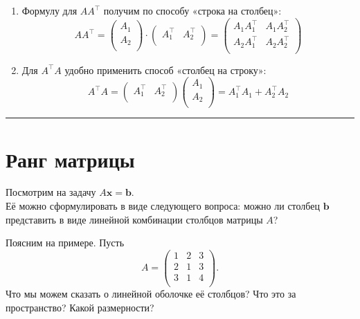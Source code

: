 \documentclass[11pt,a4paper]{article}
\renewcommand{\linethickness}{0.1ex}
\providecommand{\tightlist}{%
      \setlength{\itemsep}{0pt}\setlength{\parskip}{0pt}}
\begin{document}
\begin{enumerate}
\def\labelenumi{\arabic{enumi}.}
\tightlist
\item
  Формулу для \(A A^\top\) получим по способу «строка на столбец»: \[
    A A^\top = 
    \begin{pmatrix}
   A_1 \\
   A_2 \\
    \end{pmatrix}
    \cdot
    \begin{pmatrix}
   A_1^\top & A_2^\top \\
    \end{pmatrix}
    =
    \begin{pmatrix}
   A_1 A_1^\top & A_1 A_2^\top \\
   A_2 A_1^\top & A_2 A_2^\top \\
    \end{pmatrix}
  \]
\item
  Для \(A^\top A\) удобно применить способ «столбец на строку»: \[
    A^\top A =
    \begin{pmatrix}
   A_1^\top & A_2^\top \\
    \end{pmatrix}
    \begin{pmatrix}
   A_1 \\
   A_2 \\
    \end{pmatrix}
    = A_1^\top A_1 + A_2^\top A_2
  \]
\end{enumerate}

    \begin{center}\rule{0.5\linewidth}{\linethickness}\end{center}

    \hypertarget{ux440ux430ux43dux433-ux43cux430ux442ux440ux438ux446ux44b}{%
\section{Ранг
матрицы}\label{ux440ux430ux43dux433-ux43cux430ux442ux440ux438ux446ux44b}}

Посмотрим на задачу \(A \mathbf{x} = \mathbf{b}\).\\
Её можно сформулировать в виде следующего вопроса: можно ли столбец
\(\mathbf{b}\) представить в виде линейной комбинации столбцов матрицы
\(A\)?

Поясним на примере. Пусть \[
  A = 
  \begin{pmatrix}
     1 & 2 & 3 \\
     2 & 1 & 3 \\
     3 & 1 & 4 \\
  \end{pmatrix}.
\] Что мы можем сказать о линейной оболочке её столбцов? Что это за
пространство? Какой размерности?
\end{document}

